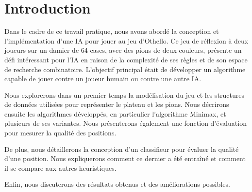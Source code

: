 \chapter{Introduction}
\label{chap:introduction}
Dans le cadre de ce travail pratique, nous avons abordé la conception et l'implémentation d'une \ac{IA} pour jouer au jeu d'Othello. Ce jeu de réflexion à deux joueurs sur un damier de 64 cases, avec des pions de deux couleurs, présente un défi intéressant pour l'IA en raison de la complexité de ses règles et de son espace de recherche combinatoire. L'objectif principal était de développer un algorithme capable de jouer contre un joueur humain ou contre une autre IA.

Nous explorerons dans un premier temps la modélisation du jeu et les structures de données utilisées pour représenter le plateau et les pions. Nous décrirons ensuite les algorithmes développés, en particulier l'algorithme Minimax, et plusieurs de ses variantes. Nous présenterons également une fonction d'évaluation pour mesurer la qualité des positions.

De plus, nous détaillerons la conception d'un classifieur pour évaluer la qualité d'une position. Nous expliquerons comment ce dernier a été entraîné et comment il se compare aux autres heuristiques.

Enfin, nous discuterons des résultats obtenus et des améliorations possibles.

